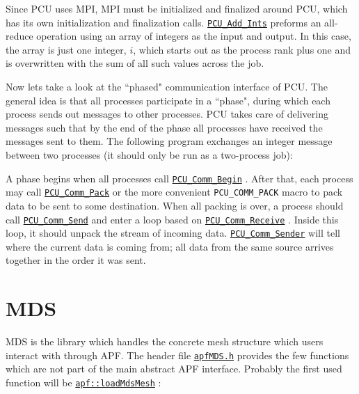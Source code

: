 \documentclass{article}
\begin{document}
Since PCU uses MPI, MPI must be initialized and finalized around
PCU, which has its own initialization and finalization calls.
\href{http://scorec.rpi.edu/~dibanez/core/pcu_8c.html#abf86ddf22cc114fd2bd3f054a067c225}{\texttt{PCU\_Add\_Ints}}
preforms an all-reduce operation using
an array of integers as the input and output.
In this case, the array is just one integer, $i$, which starts
out as the process rank plus one and is overwritten with the sum
of all such values across the job.

Now lets take a look at the ``phased" communication interface of PCU.
The general idea is that all processes participate in a ``phase",
during which each process sends out messages to other processes.
PCU takes care of delivering messages such that by the end of
the phase all processes have received the messages sent to them.
The following program exchanges an integer message between two
processes (it should only be run as a two-process job):



A phase begins when all processes call
\href{http://scorec.rpi.edu/~dibanez/core/pcu_8c.html#aa1821bf79d880c38cdd91515751799ac}{\texttt{PCU\_Comm\_Begin}}
.
After that, each process may call
\href{http://scorec.rpi.edu/~dibanez/core/pcu_8c.html#afd8a6600d960129089c45fd49c1b2311}{\texttt{PCU\_Comm\_Pack}}
or the more convenient
\texttt{PCU\_COMM\_PACK}
macro to pack data to be sent to some destination.
When all packing is over, a process should call
\href{http://scorec.rpi.edu/~dibanez/core/pcu_8c.html#a263061f00174fc7a004dcb198778006c}{\texttt{PCU\_Comm\_Send}}
and enter a loop based on
\href{http://scorec.rpi.edu/~dibanez/core/pcu_8c.html#ad02bc960bcfa8e2d6b09458dca38bf53}{\texttt{PCU\_Comm\_Receive}}
.
Inside this loop, it should unpack the stream of incoming data.
\href{http://scorec.rpi.edu/~dibanez/core/pcu_8c.html#ac4577ded2ec61de4b4141e3353aac440}{\texttt{PCU\_Comm\_Sender}}
will tell where the current data is coming
from; all data from the same source arrives together in the
order it was sent.

\section{MDS}
\label{sec:mds}

MDS is the library which handles the concrete mesh structure which
users interact with through APF.
The header file
\href{https://github.com/SCOREC/core/blob/master/mds/apfMDS.h}{\texttt{apfMDS.h}}
provides the few functions
which are not part of the main abstract APF interface.
Probably the first used function will be
\href{http://scorec.rpi.edu/~dibanez/core/namespaceapf.html#a7be5af15392b7c92c660b0958bb75969}{\texttt{apf::loadMdsMesh}}
:
\end{document}

